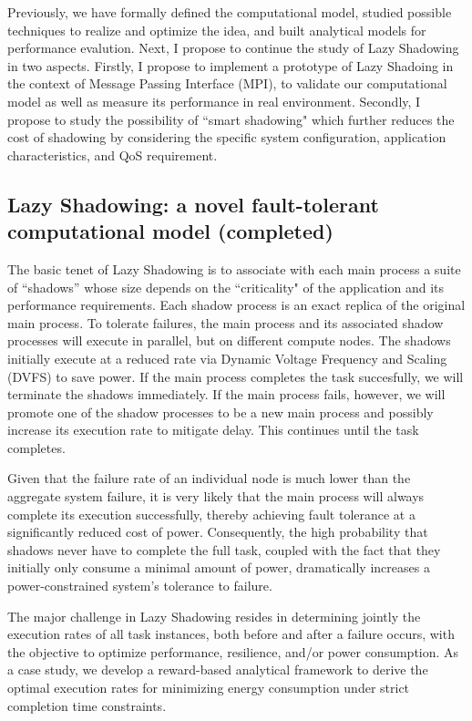Previously, we have formally defined the computational model, studied possible techniques to realize and optimize the idea, and 
built analytical models for performance evalution. Next, I propose to continue the study of Lazy Shadowing in two aspects.
Firstly, I propose to implement a prototype of Lazy Shadoing in the context of Message Passing Interface (MPI), to validate our 
computational model as well as measure its performance in real environment. Secondly, I propose to study the possibility of 
``smart shadowing" which further reduces the cost of shadowing by considering the specific system configuration, application characteristics, and QoS requirement.

\subsection{Lazy Shadowing: a novel fault-tolerant computational model (completed)}

The basic tenet of Lazy Shadowing is to associate with each main process a suite of “shadows” whose size depends on the 
``criticality" of the application and its performance requirements. Each shadow process is an exact replica of the original 
main process. To tolerate failures, the main process and its associated shadow processes will execute in parallel, but on 
different compute nodes. 
The shadows initially execute at a reduced rate via Dynamic Voltage Frequency and Scaling (DVFS) to save power. 
If the main process completes the task succesfully, we will 
terminate the shadows immediately. If the main process fails, however, we will promote one of the shadow processes to be a 
new main process and possibly increase its execution rate to mitigate delay. This continues until the task completes. 

Given that the failure rate of an individual node is much lower than the aggregate system failure, it is very likely that 
the main process will always complete its execution successfully, thereby achieving fault tolerance at a significantly reduced 
cost of power. Consequently, the high probability that shadows never have to complete the full task, coupled with the fact that 
they initially only consume a minimal amount of power, dramatically increases a power-constrained system’s tolerance to failure.

The major challenge in Lazy Shadowing resides in determining jointly the execution rates of all task instances, 
both before and after a failure occurs, with the objective to optimize performance, resilience, and/or power consumption.
As a case study, we develop a reward-based analytical framework to derive the optimal execution rates for minimizing energy 
consumption under strict completion time constraints.  


